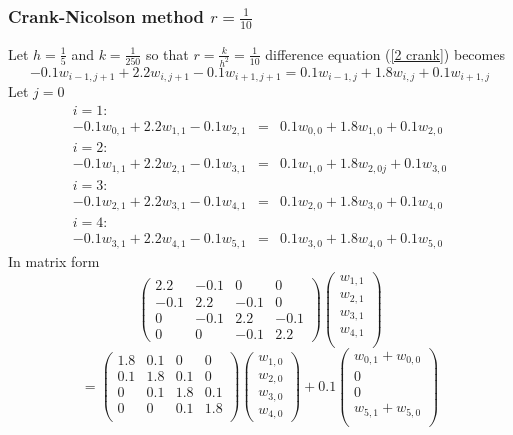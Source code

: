\begin{example}
\subsubsection{Crank-Nicolson method $r=\frac{1}{10}$}
Let $h=\frac{1}{5}$ and $k=\frac{1}{250}$ so that $r=\frac{k}{h^2}=\frac{1}{10}$
difference equation (\ref{2 crank}) becomes
\[-0.1w_{i-1,j+1}+2.2w_{i,j+1}-0.1w_{i+1,j+1}=0.1w_{i-1,j}+1.8w_{i,j}+0.1w_{i+1,j} \]
Let $j=0$
\[\begin{array}{lcl}
i=1:& &\\
-0.1w_{0,1}+2.2w_{1,1}-0.1w_{2,1}&=&0.1w_{0,0}+1.8w_{1,0}+0.1w_{2,0}\\
i=2:& &\\
-0.1w_{1,1}+2.2w_{2,1}-0.1w_{3,1}&=&0.1w_{1,0}+1.8w_{2,0j}+0.1w_{3,0}\\
i=3:& &\\
-0.1w_{2,1}+2.2w_{3,1}-0.1w_{4,1}&=&0.1w_{2,0}+1.8w_{3,0}+0.1w_{4,0}\\
i=4:& &\\
-0.1w_{3,1}+2.2w_{4,1}-0.1w_{5,1}&=&0.1w_{3,0}+1.8w_{4,0}+0.1w_{5,0}
\end{array}\]
In matrix form
\[\left(\begin{array}{cccc}
2.2&-0.1&0&0\\
-0.1&2.2&-0.1&0\\
0&-0.1&2.2&-0.1\\
0&0&-0.1&2.2
\end{array}
\right)
\left(\begin{array}{c}
w_{1,1}\\
w_{2,1}\\
w_{3,1}\\
w_{4,1}\\
\end{array}
\right)\]\[=\left(\begin{array}{cccc}
1.8&0.1&0&0\\
0.1&1.8&0.1&0\\
0&0.1&1.8&0.1\\
0&0&0.1&1.8\\

\end{array}
\right)
\left(\begin{array}{c}
w_{1,0}\\
w_{2,0}\\
w_{3,0}\\
w_{4,0}
\end{array}
\right)+0.1
\left(\begin{array}{c}
w_{0,1}+w_{0,0}\\
0\\
0\\
w_{5,1}+w_{5,0}\\
\end{array}
\right)
\]	


\end{example}
